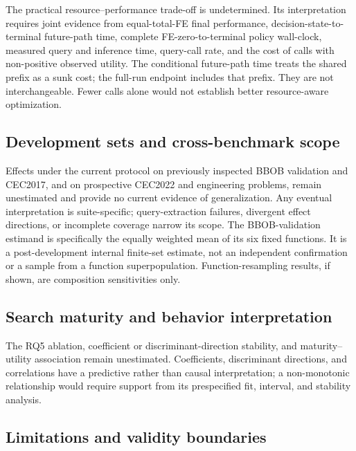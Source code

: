  The practical resource--performance trade-off is
undetermined.  Its interpretation requires joint evidence from equal-total-FE
final performance, decision-state-to-terminal future-path time, complete
FE-zero-to-terminal policy wall-clock, measured query and inference time,
query-call rate, and the cost of calls with non-positive observed utility.
The conditional future-path time treats the shared prefix as a sunk cost; the
full-run endpoint includes that prefix.  They are not interchangeable.  Fewer
calls alone would not establish better resource-aware optimization.

\subsection{Development sets and cross-benchmark scope}

 Effects under the current protocol on previously inspected
BBOB validation and CEC2017, and on prospective CEC2022 and engineering
problems, remain unestimated and provide no current evidence of generalization.
Any eventual interpretation is suite-specific; query-extraction failures,
divergent effect directions, or incomplete coverage narrow its scope.
The BBOB-validation estimand is specifically the equally weighted mean of its
six fixed functions.  It is a post-development internal finite-set estimate,
not an independent confirmation or a sample from a function superpopulation.
Function-resampling results, if shown, are composition sensitivities only.

\subsection{Search maturity and behavior interpretation}

 The RQ5 ablation, coefficient or discriminant-direction
stability, and maturity--utility association remain unestimated.  Coefficients, discriminant
directions, and correlations have a predictive rather than causal
interpretation; a non-monotonic relationship would require support from its
prespecified fit, interval, and stability analysis.

\subsection{Limitations and validity boundaries}

